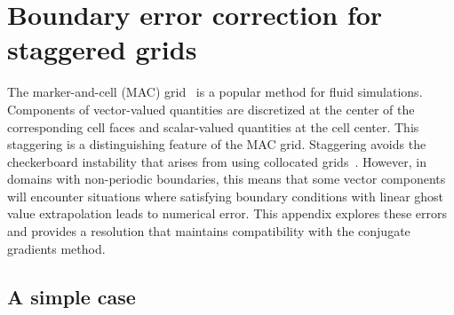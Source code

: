\section{Boundary error correction for staggered grids}\label{sec:boundary-correction}

The marker-and-cell (MAC) grid~\cite{Welch:1965jv} is a popular method for fluid
simulations. Components of vector-valued quantities are discretized at the center of the
corresponding cell faces and scalar-valued quantities at the cell center. This
staggering is a distinguishing feature of the MAC grid. Staggering avoids the
checkerboard instability that arises from using collocated grids~\cite{Wesseling:2001ci}. 
However, in domains with non-periodic boundaries, this means that some vector components
will encounter situations where satisfying boundary conditions with linear ghost value
extrapolation leads to numerical error. This appendix explores these errors and provides
a resolution that maintains compatibility with the conjugate gradients method.

\subsection{A simple case}

